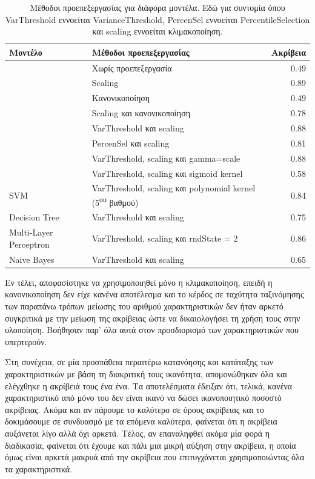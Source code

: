\begin{table}[H]
	\centering
	\begin{tabular}{@{} l l r @{}}
		\toprule
		\textbf{Μοντέλο} & \textbf{Μέθοδοι προεπεξεργασίας} & \textbf{Ακρίβεια} \\ \midrule
		 & Χωρίς προεπεξεργασία & 0.49 \\
		 & Scaling & 0.89 \\
		 & Κανονικοποίηση & 0.49 \\
		 & Scaling και κανονικοποίηση & 0.78 \\
		 & VarThreshold και scaling & 0.88 \\
		 & PercenSel και scaling & 0.81 \\
		 & VarThreshold, scaling και gamma=scale & 0.88 \\
		 & VarThreshold, scaling και sigmoid kernel & 0.58 \\
		\multirow{-9}{*}{SVM} & VarThreshold,  scaling και polynomial kernel (5\textsuperscript{ου} βαθμού) & 0.84 \\ \midrule
		Decision Tree & VarThreshold και scaling & 0.75 \\ \midrule
		Multi-Layer Perceptron & VarThreshold, scaling και rndState = 2 & 0.86 \\ \midrule
		Naive Bayes & VarThreshold και scaling & 0.65 \\ \bottomrule
	\end{tabular}
	\caption{Μέθοδοι προεπεξεργασίας για διάφορα μοντέλα. \small
	Εδώ για συντομία όπου VarThreshold εννοείται VarianceThreshold, PercenSel εννοείται PercentileSelection και scaling εννοείται κλιμακοποίηση.}
	\label{table:tab}
\end{table}

Εν τέλει, αποφασίστηκε να χρησιμοποιηθεί μόνο η κλιμακοποίηση, επειδή η κανονικοποίηση δεν είχε κανένα αποτέλεσμα και το κέρδος σε ταχύτητα ταξινόμησης των παραπάνω τρόπων μείωσης του αριθμού χαρακτηριστικών δεν ήταν αρκετό συγκριτικά με την μείωση της ακρίβειας ώστε να δικαιολογήσει τη χρήση τους στην υλοποίηση. Βοήθησαν παρ' όλα αυτά στον προσδιορισμό των χαρακτηριστικών που υπερτερούν.

Στη συνέχεια, σε μία προσπάθεια περαιτέρω κατανόησης και κατάταξης των χαρακτηριστικών με βάση τη διακριτική τους ικανότητα, απομονώθηκαν όλα και ελέγχθηκε η ακρίβειά τους ένα ένα. Τα αποτελέσματα έδειξαν ότι, τελικά, κανένα χαρακτηριστικό από μόνο του δεν είναι ικανό να δώσει ικανοποιητικό ποσοστό ακρίβειας. Ακόμα και αν πάρουμε το καλύτερο σε όρους ακρίβειας και το δοκιμάσουμε σε συνδυασμό με τα επόμενα καλύτερα, φαίνεται ότι η ακρίβεια αυξάνεται λίγο αλλά όχι αρκετά. Τέλος, αν επαναληφθεί ακόμα μία φορά η διαδικασία, φαίνεται ότι έχουμε και πάλι μια μικρή αύξηση στην ακρίβεια, η οποία όμως είναι αρκετά μακρυά από την ακρίβεια που επιτυγχάνεται χρησιμοποιώντας όλα τα χαρακτηριστικά.

